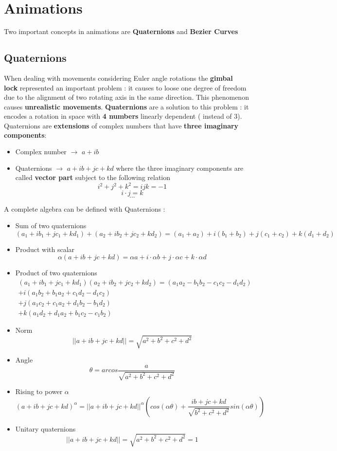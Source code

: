 \newpage
\section{Animations}
Two important concepts in animations are \textbf{Quaternions} and \textbf{Bezier Curves}

\subsection{Quaternions}
When dealing with movements considering Euler angle rotations the \textbf{gimbal lock} represented an important problem : it causes to loose one degree of freedom due to the alignment of two rotating axis in the same direction. This phenomenon causes \textbf{unrealistic movements}. \textbf{Quaternions} are a solution to this problem : it encodes a rotation in space with \textbf{4 numbers} linearly dependent ( instead of 3).\\
Quaternions are \textbf{extensions} of complex numbers that have \textbf{three imaginary components}:
\begin{itemize}
\item Complex number $\rightarrow$ $a+ib$
\item Quaternions $\rightarrow$ $a+ib+jc+kd$ where the three imaginary components are called \textbf{vector part} subject to the following relation $$ i^2 + j^2 + k^2 = ijk = -1$$ $$ i \cdot j = k  $$ $$... $$
\end{itemize}
A complete algebra can be defined with Quaternions : 
\begin{itemize}
\item Sum of two quaternions $$ (a_1+ib_1+jc_1+kd_1)+(a_2+ib_2+jc_2+kd_2) = (a_1+a_2)+i(b_1+b_2)+j(c_1+c_2)+k(d_1+d_2)$$
\item Product with scalar $$ \alpha(a+ib+jc+kd)= \alpha a+i\cdot \alpha
 b + j\cdot \alpha c + k\cdot \alpha d$$
\item Product of two quaternions
 \begin{align*}
(a_1+ib_1+jc_1+kd_1)(a_2+ib_2+jc_2+kd_2) = (a_1a_2-b_1b_2-c_1c_2-d_1d_2)\\+i(a_1b_2+b_1a_2+c_1d_2-d_1c_2)\\+j(a_1c_2+c_1a_2+d_1b_2-b_1d_2)\\+k(a_1d_2+d_1a_2+b_1c_2-c_1b_2)
\end{align*}
\item Norm $$ ||a+ib+jc+kd||= \sqrt{a^2+b^2+c^2+d^2}$$
\item Angle $$ \theta = arcos\frac{a}{\sqrt{a^2+b^2+c^2+d^2}} $$
\item Rising to power $\alpha$ $$ (a+ib+jc+kd)^{\alpha}= ||a+ib+jc+kd||^{\alpha}\left( cos(\alpha \theta)+ \frac{ib+jc+kd}{\sqrt{b^2+c^2+d^2}}sin(\alpha \theta)\right)$$
\item Unitary quaternions $$ ||a+ib+jc+kd||= \sqrt{a^2+b^2+c^2+d^2} = 1$$
\end{itemize}
